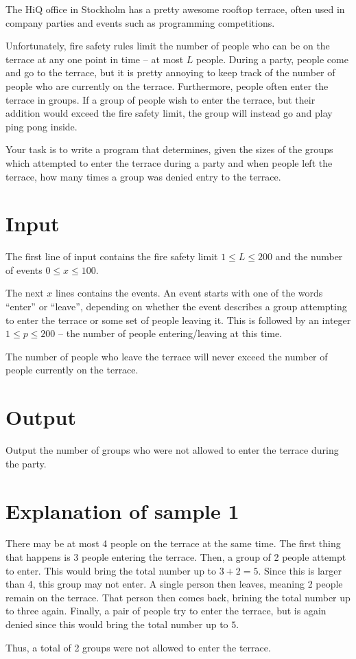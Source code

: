The HiQ office in Stockholm has a pretty awesome rooftop terrace, often used in company parties and events such as programming competitions.

Unfortunately, fire safety rules limit the number of people who can be on the terrace at any one point in time -- at most $L$ people.
During a party, people come and go to the terrace, but it is pretty annoying to keep track of the number of people who are currently on the terrace. Furthermore, people often enter the terrace in groups. If a group of people wish to enter the terrace, but their addition would exceed the fire safety limit, the group will instead go and play ping pong inside. 

Your task is to write a program that determines, given the sizes of the groups which attempted to enter the terrace during a party and when people left the terrace, how many times a group was denied entry to the terrace.

\section*{Input}
The first line of input contains the fire safety limit $1 \le L \le 200$ and the number of events $0 \le x \le 100$.

The next $x$ lines contains the events.
An event starts with one of the words ``enter'' or ``leave'', depending on whether the event describes a group attempting to enter the terrace or some set of people leaving it.
This is followed by an integer $1 \le p \le 200$ -- the number of people entering/leaving at this time.

The number of people who leave the terrace will never exceed the number of people currently on the terrace.

\section*{Output}
Output the number of groups who were not allowed to enter the terrace during the party.

\section*{Explanation of sample 1}
There may be at most 4 people on the terrace at the same time.
The first thing that happens is 3 people entering the terrace.
Then, a group of 2 people attempt to enter.
This would bring the total number up to $3 + 2 = 5$.
Since this is larger than 4, this group may not enter.
A single person then leaves, meaning 2 people remain on the terrace.
That person then comes back, brining the total number up to three again.
Finally, a pair of people try to enter the terrace, but is again denied since this would bring the total number up to $5$.

Thus, a total of 2 groups were not allowed to enter the terrace.
